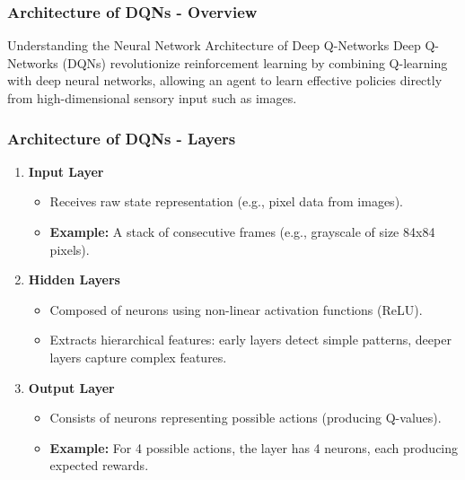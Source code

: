 \documentclass[aspectratio=169]{beamer}
\begin{document}
\begin{frame}[fragile]
    \frametitle{Architecture of DQNs - Overview}
    \begin{block}{Understanding the Neural Network Architecture of Deep Q-Networks}
        Deep Q-Networks (DQNs) revolutionize reinforcement learning by combining Q-learning with deep neural networks, allowing an agent to learn effective policies directly from high-dimensional sensory input such as images.
    \end{block}
\end{frame}

\begin{frame}[fragile]
    \frametitle{Architecture of DQNs - Layers}
    \begin{enumerate}
        \item \textbf{Input Layer}
        \begin{itemize}
            \item Receives raw state representation (e.g., pixel data from images).
            \item \textbf{Example:} A stack of consecutive frames (e.g., grayscale of size 84x84 pixels).
        \end{itemize}
        
        \item \textbf{Hidden Layers}
        \begin{itemize}
            \item Composed of neurons using non-linear activation functions (ReLU).
            \item Extracts hierarchical features: early layers detect simple patterns, deeper layers capture complex features.
        \end{itemize}
        
        \item \textbf{Output Layer}
        \begin{itemize}
            \item Consists of neurons representing possible actions (producing Q-values).
            \item \textbf{Example:} For 4 possible actions, the layer has 4 neurons, each producing expected rewards.
        \end{itemize}
    \end{enumerate}
\end{frame}
\end{document}
